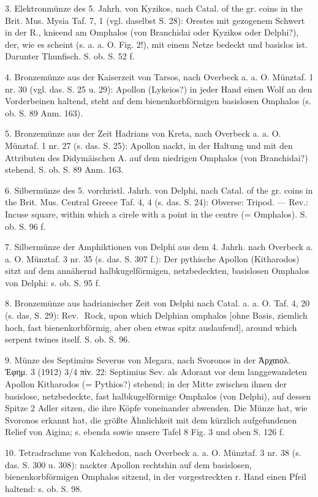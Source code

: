 \documentclass[a4paper, 11pt, oneside]{article}
\newcommand*\svgACA{}
\begin{document}
3. Elektronmünze des 5. Jahrh. von Kyzikos, nach Catal. of the gr. coins in the Brit. Mus. Mysia Taf. 7, 1 (vgl. daselbst S. 28): Orestes mit gezogenem Schwert in der R., knieend am Omphalos (von Branchidai oder Kyzikos oder Delphi?), der, wie es scheint (s. a. a. O. Fig. 2!), mit einem Netze bedeckt und basislos ist. Darunter Thunfisch. S. ob. S. 52 f.

4. Bronzemünze aus der Kaiserzeit von Tarsos, nach Overbeck a. a. O. Münztaf. 1 nr. 30 (vgl. das. S. 25 u. 29): Apollon (Lykeios?) in jeder Hand einen Wolf an den Vorderbeinen haltend, steht auf dem bienenkorbförmigen basislosen Omphalos (s. ob. S. 89 Anm. 163).

5. Bronzemünze aus der Zeit Hadrians von Kreta, nach Overbeck a. a. O. Münztaf. 1 nr. 27 (s. das. S. 25): Apollon nackt, in der Haltung und mit den Attributen des Didymäischen A. auf dem niedrigen Omphalos (von Branchidai?) stehend. S. ob. S. 89 Anm. 163.

6. Silbermünze des 5. vorchristl. Jahrh. von Delphi, nach Catal. of the gr. coins in the Brit. Mus. Central Greece Taf. 4, 4 (s. das. S. 24): Obverse: Tripod. --- Rev.: Incuse square, within which a cirele with a point in the centre (= Omphalos). S. ob. S. 96 f.

7. Silbermünze der Amphiktionen von Delphi aus dem 4. Jahrh. nach Overbeck a. a. O. Münztaf. 3 nr. 35 (s. das. S. 307 f.): Der pythische Apollon (Kitharodos) sitzt auf dem annähernd halbkugelförmigen, netzbedeckten, basislosen Omphalos von Delphi: s. ob. S. 95 f.

8. Bronzemünze aus hadrianischer Zeit von Delphi nach Catal. a. a. O. Taf. 4, 20 (s. das, S. 29): Rev. $\svgACA$ Rock, upon which Delphian omphalos [ohne Basis, ziemlich hoch, fast bienenkorbförmig, aber oben etwas spitz auslaufend], around which serpent twines itself. S. ob. S. 96.

9. Münze des Septimius Severus von Megara, nach Svoronos in der Ἀρχαιολ. Ἐφημ. 3 (1912) 3/4 πίν. 22: Septimius Sev. als Adorant vor dem langgewandeten Apollon Kitharodos (= Pythios?) stehend; in der Mitte zwischen ihnen der basislose, netzbedeckte, fast halbkugelförmige Omphalos (von Delphi), auf dessen Spitze 2 Adler sitzen, die ihre Köpfe voneinander abwenden. Die Münze hat, wie Svoronos erkannt hat, die größte Ähnlichkeit mit dem kürzlich aufgefundenen Relief von Aigina; s. ebenda sowie unsere Tafel 8 Fig. 3 und oben S. 126 f.

10. Tetradrachme von Kalchedon, nach Overbeck a. a. O. Münztaf. 3 nr. 38 (s. das. S. 300 u. 308): nackter Apollon rechtshin auf dem basislosen, bienenkorbförmigen Omphalos sitzend, in der vorgestreckten r. Hand einen Pfeil haltend: s. ob. S. 98.
\end{document}
